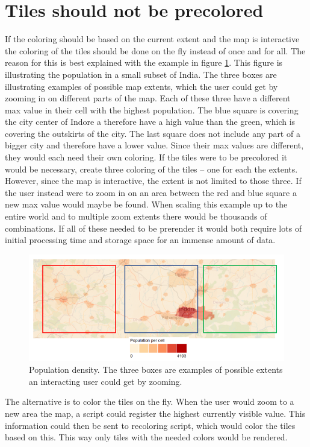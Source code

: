 \section{Tiles should not be precolored}
If the coloring should be based on the current extent and the map is interactive the coloring of the tiles should be done on the fly instead of once and for all. The reason for this is best explained with the example in figure \ref{WhyNotPrecolor}. This figure is illustrating the population in a small subset of India.  The three boxes are illustrating examples of possible map extents, which the user could get by zooming in on different parts of the map. Each of these three have a different max value in their cell with the highest population. The blue square is covering the city center of Indore a therefore have a high value than the green, which is covering the outskirts of the city. The last square does not include any part of a bigger city and therefore have a lower value. 
Since their max values are different, they would each need their own coloring. If the tiles were to be precolored it would be necessary, create three coloring of the tiles – one for each the extents. However, since the map is interactive, the extent is not limited to those three. If the user instead were to zoom in on an area between the red and blue square a new max value would maybe be found. When scaling this example up to the entire world and to multiple zoom extents there would be thousands of combinations. If all of these needed to be prerender it would both require lots of initial processing time and storage space for an immense amount of data. 
 
 
\begin{figure} [H]
	\centering
	\includegraphics[width=.8\textwidth]{Pictures/WhyNotPrecolor}
	\caption{Population density. The three boxes are examples of possible extents an interacting user could get by zooming.}
	\label{WhyNotPrecolor}
\end{figure}

The alternative is to color the tiles on the fly. When the user would zoom to a new area the map, a script could register the highest currently visible value. This information could then be sent to recoloring script, which would color the tiles based on this. This way only tiles with the needed colors would be rendered. 


